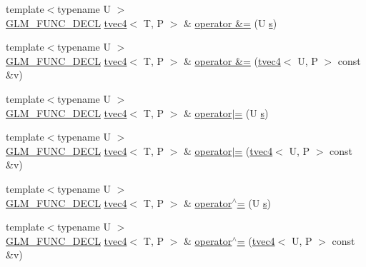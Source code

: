 \begin{DoxyCompactItemize}
{\footnotesize template$<$typename U $>$ }\\\hyperlink{setup_8hpp_ab2d052de21a70539923e9bcbf6e83a51}{G\+L\+M\+\_\+\+F\+U\+N\+C\+\_\+\+D\+E\+CL} \hyperlink{structglm_1_1detail_1_1tvec4}{tvec4}$<$ T, P $>$ \& \hyperlink{structglm_1_1detail_1_1tvec4_a6c1d19faeafe7da8f30f2e8f46283302}{operator \&=} (U \hyperlink{structglm_1_1detail_1_1tvec4_a82cbced4cbd070056c5acbc1d4d4906f}{s})
\item 
{\footnotesize template$<$typename U $>$ }\\\hyperlink{setup_8hpp_ab2d052de21a70539923e9bcbf6e83a51}{G\+L\+M\+\_\+\+F\+U\+N\+C\+\_\+\+D\+E\+CL} \hyperlink{structglm_1_1detail_1_1tvec4}{tvec4}$<$ T, P $>$ \& \hyperlink{structglm_1_1detail_1_1tvec4_a133b52105c4fe3aa55d0ef4318902cb7}{operator \&=} (\hyperlink{structglm_1_1detail_1_1tvec4}{tvec4}$<$ U, P $>$ const \&v)
\item 
{\footnotesize template$<$typename U $>$ }\\\hyperlink{setup_8hpp_ab2d052de21a70539923e9bcbf6e83a51}{G\+L\+M\+\_\+\+F\+U\+N\+C\+\_\+\+D\+E\+CL} \hyperlink{structglm_1_1detail_1_1tvec4}{tvec4}$<$ T, P $>$ \& \hyperlink{structglm_1_1detail_1_1tvec4_a9841c9154372e67d5d6e0b459848ca86}{operator$\vert$=} (U \hyperlink{structglm_1_1detail_1_1tvec4_a82cbced4cbd070056c5acbc1d4d4906f}{s})
\item 
{\footnotesize template$<$typename U $>$ }\\\hyperlink{setup_8hpp_ab2d052de21a70539923e9bcbf6e83a51}{G\+L\+M\+\_\+\+F\+U\+N\+C\+\_\+\+D\+E\+CL} \hyperlink{structglm_1_1detail_1_1tvec4}{tvec4}$<$ T, P $>$ \& \hyperlink{structglm_1_1detail_1_1tvec4_a6e487f3a13cff94c633d2f4961f8d82a}{operator$\vert$=} (\hyperlink{structglm_1_1detail_1_1tvec4}{tvec4}$<$ U, P $>$ const \&v)
\item 
{\footnotesize template$<$typename U $>$ }\\\hyperlink{setup_8hpp_ab2d052de21a70539923e9bcbf6e83a51}{G\+L\+M\+\_\+\+F\+U\+N\+C\+\_\+\+D\+E\+CL} \hyperlink{structglm_1_1detail_1_1tvec4}{tvec4}$<$ T, P $>$ \& \hyperlink{structglm_1_1detail_1_1tvec4_ade267c789e5e2fa64194f676fbede6d3}{operator$^\wedge$=} (U \hyperlink{structglm_1_1detail_1_1tvec4_a82cbced4cbd070056c5acbc1d4d4906f}{s})
\item 
{\footnotesize template$<$typename U $>$ }\\\hyperlink{setup_8hpp_ab2d052de21a70539923e9bcbf6e83a51}{G\+L\+M\+\_\+\+F\+U\+N\+C\+\_\+\+D\+E\+CL} \hyperlink{structglm_1_1detail_1_1tvec4}{tvec4}$<$ T, P $>$ \& \hyperlink{structglm_1_1detail_1_1tvec4_a5e3b455605338080eaedad86af4eb38e}{operator$^\wedge$=} (\hyperlink{structglm_1_1detail_1_1tvec4}{tvec4}$<$ U, P $>$ const \&v)

\end{DoxyCompactItemize}
